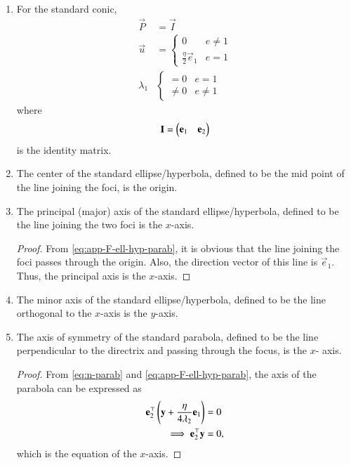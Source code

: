 \begin{enumerate}[label=\thesubsection.\arabic*.,ref=\thesubsection.\theenumi]
	  \item
		For the standard conic, 
				\begin{align}
					\label{eq:app-std-prm-P}
					\vec{P} &= \vec{I}
					\\
					\vec{u} &= 
				\begin{cases}
				0 & e \ne 1
       \\
				\frac{\eta}{2} \vec{e}_1 & e = 1
				\end{cases}
				\label{eq:std-prm-u}
				\\
				\lambda_1 &  
					\begin{cases}
						=0 & e = 1
						\\
						\ne 0 & e \ne 1
					\end{cases}
				\label{eq:std-prm-lam1}
				\end{align}
				where 
				\begin{align}
					\mathbf{I} = \begin{pmatrix}\mathbf{e}_1 & \mathbf{e}_2\end{pmatrix}
				\end{align}
				is the identity matrix.
	\item
			\label{corr:center}
			The center of the standard ellipse/hyperbola, defined to be the mid point of the line joining the foci, is the origin.
	
	\item
		\label{corr:axis}
			The principal (major) axis of the standard ellipse/hyperbola, defined to be the line joining the two foci   is the $x$-axis.  
	
	\begin{proof}
		From 	\eqref{eq:app-F-ell-hyp-parab}, it is obvious that the line joining the foci passes through the origin.  Also, the direction vector of this line is $\vec{e}_1$.  Thus, the principal axis is the $x$-axis. 
	\end{proof}
	\item
		\label{corr:minor-axis}
			The minor axis of the standard ellipse/hyperbola, defined to be the line orthogonal to the $x$-axis is the $y$-axis. 
	


	\item
			The axis of symmetry of the standard parabola, defined to be the line perpendicular to the directrix and passing through the focus,  is the $x$- axis.
	
	\begin{proof}
	From \eqref{eq:n-parab} and 	
					\eqref{eq:app-F-ell-hyp-parab}, 
					the axis of the parabola  can be expressed 
     as 
		\begin{align}
			\mathbf{e}_2^{\top}\left(\mathbf{y}  
			+\frac{\eta}{4\lambda_2}\mathbf{e}_1\right) &= 0
			\\
			\implies \mathbf{e}_2^{\top}\mathbf{y} &= 0
					\label{eq:axis-std-parab}, 
		\end{align}
		which is the equation of the $x$-axis.
	\end{proof}



\end{enumerate}
